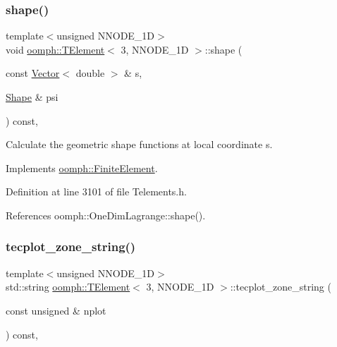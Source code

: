 \subsubsection{\texorpdfstring{shape()}{shape()}}
{\footnotesize\ttfamily template$<$unsigned N\+N\+O\+D\+E\+\_\+1D$>$ \\
void \hyperlink{classoomph_1_1TElement}{oomph\+::\+T\+Element}$<$ 3, N\+N\+O\+D\+E\+\_\+1D $>$\+::shape (\begin{DoxyParamCaption}\item[{const \hyperlink{classoomph_1_1Vector}{Vector}$<$ double $>$ \&}]{s,  }\item[{\hyperlink{classoomph_1_1Shape}{Shape} \&}]{psi }\end{DoxyParamCaption}) const\hspace{0.3cm}{\ttfamily [inline]}, {\ttfamily [virtual]}}



Calculate the geometric shape functions at local coordinate s. 



Implements \hyperlink{classoomph_1_1FiniteElement_a58a25b6859ddd43b7bfe64a19fee5023}{oomph\+::\+Finite\+Element}.



Definition at line 3101 of file Telements.\+h.



References oomph\+::\+One\+Dim\+Lagrange\+::shape().

\mbox{\label{classoomph_1_1TElement_3_013_00_01NNODE__1D_01_4_a857b239f0a79b18542749ee94e441c88}} 
\subsubsection{\texorpdfstring{tecplot\+\_\+zone\+\_\+string()}{tecplot\_zone\_string()}}
{\footnotesize\ttfamily template$<$unsigned N\+N\+O\+D\+E\+\_\+1D$>$ \\
std\+::string \hyperlink{classoomph_1_1TElement}{oomph\+::\+T\+Element}$<$ 3, N\+N\+O\+D\+E\+\_\+1D $>$\+::tecplot\+\_\+zone\+\_\+string (\begin{DoxyParamCaption}\item[{const unsigned \&}]{nplot }\end{DoxyParamCaption}) const\hspace{0.3cm}{\ttfamily [inline]}, {\ttfamily [virtual]}}



